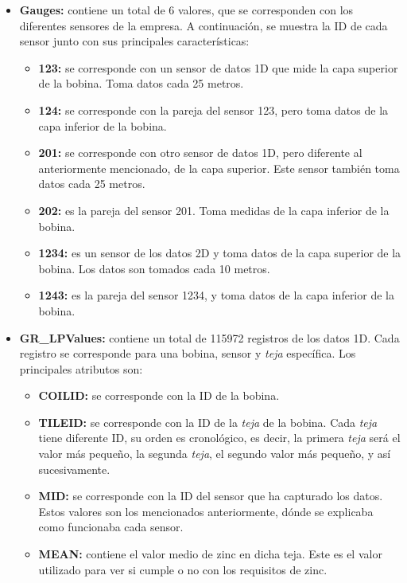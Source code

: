 \begin{itemize}
    \item \textbf{Gauges:} contiene un total de 6 valores, que se corresponden con los diferentes sensores de la empresa. A continuación, se muestra la ID de cada sensor junto con sus principales características:
        \begin{itemize}
         \item \textbf{123:} se corresponde con un sensor de datos 1D que mide la capa superior de la bobina. Toma datos cada 25 metros.
        \item \textbf{124:} se corresponde con la pareja del sensor 123, pero toma datos de la capa inferior de la bobina.
        \item \textbf{201:} se corresponde con otro sensor de datos 1D, pero diferente al anteriormente mencionado, de la capa superior. Este sensor también toma datos cada 25 metros.
        \item \textbf{202:} es la pareja del sensor 201. Toma medidas de la capa inferior de la bobina.
        \item \textbf{1234:} es un sensor de los datos 2D y toma datos de la capa superior de la bobina. Los datos son tomados cada 10 metros.
        \item \textbf{1243:} es la pareja del sensor 1234, y toma datos de la capa inferior de la bobina.
        \end{itemize}
    \item \textbf{GR\_LPValues:} contiene un total de 115972 registros de los datos 1D. Cada registro se corresponde para una bobina, sensor y \emph{teja} específica. Los principales atributos son:
    \begin{itemize}
        \item \textbf{COILID:} se corresponde con la ID de la bobina.
        \item \textbf{TILEID:} se corresponde con la ID de la \emph{teja} de la bobina. Cada \emph{teja} tiene diferente ID, su orden es cronológico, es decir, la primera \emph{teja} será el valor más pequeño, la segunda \emph{teja}, el segundo valor más pequeño, y así sucesivamente.
        \item \textbf{MID:} se corresponde con la ID del sensor que ha capturado los datos. Estos valores son los mencionados anteriormente, dónde se explicaba como funcionaba cada sensor.
        \item \textbf{MEAN:} contiene el valor medio de zinc en dicha teja. Este es el valor utilizado para ver si cumple o no con los requisitos de zinc.  

\end{itemize}
\end{itemize}
